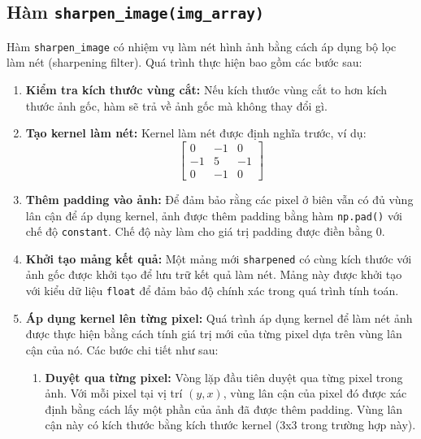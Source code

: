 \subsection{Hàm \texttt{sharpen\_image(img\_array)}}
Hàm \texttt{sharpen\_image} có nhiệm vụ làm nét hình ảnh bằng cách áp dụng bộ lọc làm nét (sharpening filter). Quá trình thực hiện bao gồm các bước sau:

\begin{enumerate}

	\item \textbf{Kiểm tra kích thước vùng cắt:}
	      Nếu kích thước vùng cắt to hơn kích thước ảnh gốc, hàm sẽ trả về ảnh gốc mà không thay đổi gì.

	\item \textbf{Tạo kernel làm nét:}
	      Kernel làm nét được định nghĩa trước, ví dụ:
	      \[
		      \begin{bmatrix}
			      0  & -1 & 0  \\
			      -1 & 5  & -1 \\
			      0  & -1 & 0
		      \end{bmatrix}
	      \]

	\item \textbf{Thêm padding vào ảnh:}
	      Để đảm bảo rằng các pixel ở biên vẫn có đủ vùng lân cận để áp dụng kernel, ảnh được thêm padding bằng hàm \texttt{np.pad()} với chế độ \texttt{constant}. Chế độ này làm cho giá trị padding được điền bằng 0.

	\item \textbf{Khởi tạo mảng kết quả:}
	      Một mảng mới \texttt{sharpened} có cùng kích thước với ảnh gốc được khởi tạo để lưu trữ kết quả làm nét. Mảng này được khởi tạo với kiểu dữ liệu \texttt{float} để đảm bảo độ chính xác trong quá trình tính toán.

	\item \textbf{Áp dụng kernel lên từng pixel:}
	      Quá trình áp dụng kernel để làm nét ảnh được thực hiện bằng cách tính giá trị mới của từng pixel dựa trên vùng lân cận của nó. Các bước chi tiết như sau:

	      \begin{enumerate}


		      \item \textbf{Duyệt qua từng pixel:}
		            Vòng lặp đầu tiên duyệt qua từng pixel trong ảnh. Với mỗi pixel tại vị trí \((y, x)\), vùng lân cận của pixel đó được xác định bằng cách lấy một phần của ảnh đã được thêm padding. Vùng lân cận này có kích thước bằng kích thước kernel (3x3 trong trường hợp này).


\end{enumerate}
\end{enumerate}
